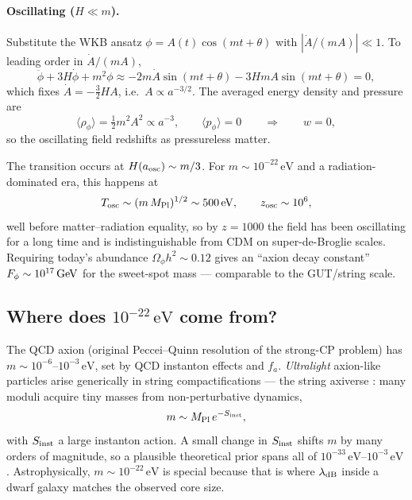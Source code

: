 \documentclass[12pt]{article}
\newcommand{\lambdadB}{\lambda_{\rm dB}}
\newcommand{\eV}{\,\mathrm{eV}}
\begin{document}
\paragraph{Oscillating ($H\ll m$).}  Substitute the WKB ansatz
$\phi = A(t)\cos(mt+\theta)$ with $|\dot A/(mA)|\ll 1$.  To leading
order in $\dot A/(mA)$,
%
\begin{equation}
  \ddot\phi + 3H\dot\phi + m^2\phi
    \approx -2m\dot A\sin(mt+\theta) - 3HmA\sin(mt+\theta) = 0,
\end{equation}
%
which fixes $\dot A = -\tfrac{3}{2}HA$, i.e.\ $A\propto a^{-3/2}$.
The averaged energy density and pressure are
%
\begin{equation}
  \langle\rho_\phi\rangle = \tfrac{1}{2}m^2 A^2 \propto a^{-3},
  \qquad
  \langle p_\phi\rangle = 0
  \qquad \Longrightarrow\qquad w = 0,
\end{equation}
%
so the oscillating field redshifts as pressureless matter.

The transition occurs at $H(a_{\rm osc})\sim m/3$.  For $m\sim
10^{-22}\eV$ and a radiation-dominated era, this happens at
%
\begin{equation}
  T_{\rm osc} \sim (m\,M_{\rm Pl})^{1/2}
    \sim 500\eV,
  \qquad z_{\rm osc}\sim 10^{6},
\end{equation}
%
well before matter--radiation equality, so by $z=1000$ the field has
been oscillating for a long time and is indistinguishable from CDM on
super-de-Broglie scales.  Requiring today's abundance
$\Omega_\phi h^2\sim 0.12$ gives an ``axion decay constant''
$F_\phi\sim 10^{17}\,{\rm GeV}$ for the sweet-spot mass ---
comparable to the GUT/string scale.

\subsection{Where does $10^{-22}\eV$ come from?}

The QCD axion (original Peccei--Quinn resolution of the strong-CP
problem) has $m\sim 10^{-6}$--$10^{-3}\eV$, set by QCD instanton
effects and $f_a$.  \emph{Ultralight} axion-like particles arise
generically in string compactifications --- the string axiverse
\citep{Arvanitaki2010}: many moduli acquire tiny masses from
non-perturbative dynamics,
%
\begin{equation}
  m \sim M_{\rm Pl}\,e^{-S_{\rm inst}},
\end{equation}
%
with $S_{\rm inst}$ a large instanton action.  A small change in
$S_{\rm inst}$ shifts $m$ by many orders of magnitude, so a plausible
theoretical prior spans all of
$10^{-33}\eV$--$10^{-3}\eV$.  Astrophysically, $m\sim 10^{-22}\eV$ is
special because that is where $\lambdadB$ inside a dwarf galaxy
matches the observed core size.
\end{document}
